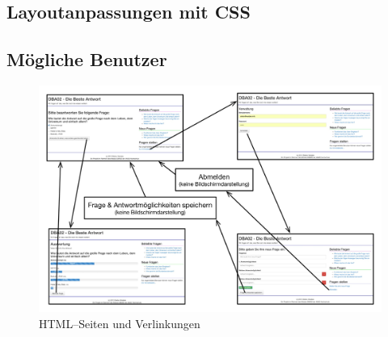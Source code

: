 \subsection{Layoutanpassungen mit CSS}



\subsection{Mögliche Benutzer}
\begin{figure}[h]
\begin{center}
\includegraphics[width=\textwidth]{zustaende.jpg}
\caption{HTML--Seiten und Verlinkungen}
\end{center}
\label{fig:zustaende}
\end{figure}

